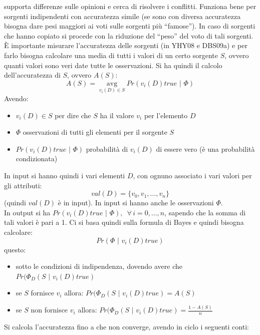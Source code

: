 \documentclass[a4paper,12pt, oneside]{book}
\begin{document}
supporta differenze sulle opinioni e cerca di risolvere i conflitti. Funziona
bene per sorgenti indipendenti con accuratezza simile (se sono con diversa
accuratezza bisogna dare pesi maggiori ai voti sulle sorgenti più
``famose''). In caso di sorgenti che hanno copiato si procede con la riduzione
del ``peso'' del voto di tali sorgenti.\\
È importante misurare l'accuratezza delle sorgenti (in YHY08 e DBS09a) e per
farlo bisogna calcolare una media di tutti i valori di un certo sorgente $S$,
ovvero quanti valori sono veri date tutte le osservazioni. Si ha quindi il
calcolo dell'accuratezza di $S$, ovvero $A(S)$:
\[A(S)=\operatorname*{avg}_{v_i(D)\in S}Pr(v_i(D) true\,\,|\,\,\Phi)\]
Avendo:
\begin{itemize}
  \item $v_i(D)\in S$ per dire che $S$ ha il valore $v_i$ per l'elemento $D$
  \item $\Phi$ osservazioni di tutti gli elementi per il sorgente $S$
  \item $Pr(v_i(D) true\,\,|\,\,\Phi)$ probabilità di $v_i(D)$ di essere vero (è
  una probabilità condizionata)
\end{itemize}
In input si hanno quindi i vari elementi $D$, con ognuno associato i vari
valori per gli attributi:
\[val(D)=\{v_0,v_1,\ldots,v_n\}\]
(quindi $val(D)$ è in input). In input si hanno anche le osservazioni $\Phi$.\\
In output si ha $Pr(v_i(D) true\,\,|\,\,\Phi), \,\,\,\forall\,i=0,\ldots,n$,
sapendo che la somma di tali valori è pari a 1. Ci si basa quindi sulla formula
di Bayes e quindi bisogna calcolare:
\[Pr(\Phi\,\,|\,\,v_i(D) true)\]
questo:
\begin{itemize}
  \item sotto le condizioni di indipendenza, dovendo avere che\\
  $Pr(\Phi_D(S\,\,|\,\,v_i(D) true)$  
  \item se $S$ fornisce $v_i$ allora: $Pr(\Phi_D(S\,\,|\,\,v_i(D) true)=A(S)$  
  \item se $S$ non fornisce $v_i$ allora: $Pr(\Phi_D(S\,\,|\,\,v_i(D)
  true)=\frac{1-A(S)}{n}$ 
\end{itemize}
Si calcola l'accuratezza fino a che non converge, avendo in ciclo i seguenti
conti:
\end{document}
